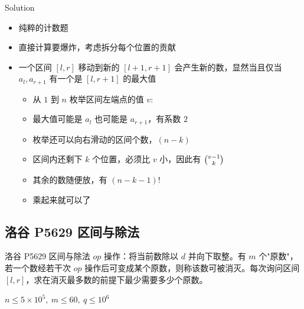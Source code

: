 ﻿\documentclass[aspectratio=169]{ctexbeamer}
\begin{document}
\begin{frame}{Solution}
    \begin{itemize}
        \item 纯粹的计数题
        \item 直接计算要爆炸，考虑拆分每个位置的贡献
        \item 一个区间 $[l,r]$ 移动到新的 $[l+1,r+1]$ 会产生新的数，显然当且仅当 $a_{l},a_{r+1}$ 有一个是 $[l,r+1]$ 的最大值
        \begin{itemize}
            \item 从 $ 1 $ 到 $ n $ 枚举区间左端点的值 $v$:
            \item 最大值可能是 $a_l$ 也可能是 $a_{r+1}$，有系数 $ 2 $
            \item 枚举还可以向右滑动的区间个数，$(n-k)$
            \item 区间内还剩下 $k$ 个位置，必须比 $v$ 小，因此有 $\tbinom{v-1}{k}$
            \item 其余的数随便放，有 $(n-k-1)!$
            \item 乘起来就可以了
        \end{itemize}
    \end{itemize}
\end{frame}









\subsection{洛谷 P5629 区间与除法}
\begin{frame}{洛谷 P5629 区间与除法}
    $op$ 操作：将当前数除以 $d$ 并向下取整。有 $m$ 个"原数"，若一个数经若干次 $op$ 操作后可变成某个原数，则称该数可被消灭。每次询问区间 $[l,r]$，求在消灭最多数的前提下最少需要多少个原数。
    
    $n\le 5\times10^5,\ m\le 60,\ q\le 10^6$
\end{frame}
\end{document}
